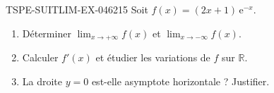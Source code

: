 \begin{exercice}{TSPE-SUITLIM-EX-046}{2}{15}
Soit $f(x) = (2x + 1)\,\mathrm{e}^{-x}$.
\begin{enumerate}
  \item Déterminer $\lim_{x \to +\infty} f(x)$ et $\lim_{x \to -\infty} f(x)$.
  \item Calculer $f'(x)$ et étudier les variations de $f$ sur $\mathbb{R}$.
  \item La droite $y = 0$ est-elle asymptote horizontale ? Justifier.
\end{enumerate}
\end{exercice}
